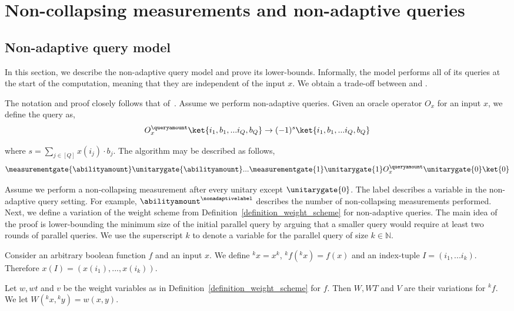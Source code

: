 \section{Non-collapsing measurements and non-adaptive queries}

\subsection{Non-adaptive query model}\label{subsection_nonadaptive_model}

In this section, we describe the non-adaptive query model and prove its lower-bounds. Informally, the model performs all of its queries at the start of the computation, meaning that they are independent of the input $x$. We obtain a trade-off between \queryamount and \abilityamount.

The notation and proof closely follows that of~\cite{nonadaptive_weighted_adversary}. Assume we perform \queryamount non-adaptive queries. Given an oracle operator $O_x$ for an input $x$, we define the query as,
\begin{align*}
    O_x^{\queryamount} \ket{i_1, b_1, ... i_Q, b_Q} \rightarrow (-1)^{s} \ket{i_1, b_1, ... i_Q, b_Q}
\end{align*}

where $s = \sum_{j\in [Q]} x(i_j)\cdot b_j$. The algorithm may be described as follows,
\begin{align*}
    \measurementgate{\abilityamount}\unitarygate{\abilityamount}... \measurementgate{1}\unitarygate{1}O_x^{\queryamount}\unitarygate{0}\ket{0}
\end{align*}

Assume we perform a non-collapsing measurement after every unitary except $\unitarygate{0}$. The label \nonadaptivelabel describes a variable in the non-adaptive query setting. For example, $\abilityamount^{\nonadaptivelabel}$ describes the number of non-collapsing measurements performed. Next, we define a variation of the weight scheme from Definition~\ref{definition_weight_scheme} for non-adaptive queries. The main idea of the proof is lower-bounding the minimum size of the initial parallel query by arguing that a smaller query would require at least two rounds of parallel queries. We use the superscript $k$ to denote a variable for the parallel query of size $k\in \mathbb{N}$.

\begin{definition}\label{definition_nonadaptive}
    Consider an arbitrary boolean function $f$ and an input $x$. We define ${}^k x = x^k$, ${}^k f({}^k x) = f(x)$ and an index-tuple $I = (i_1, ... i_k)$. Therefore $x(I) = (x(i_1),...,x(i_k))$. 
    
    Let $w, wt$ and $v$ be the weight variables as in Definition~\ref{definition_weight_scheme} for $f$. Then $W, WT$ and $V$ are their variations for ${}^k f$. We let $W({}^k x, {}^k y) = w(x,y)$.
\end{definition}

